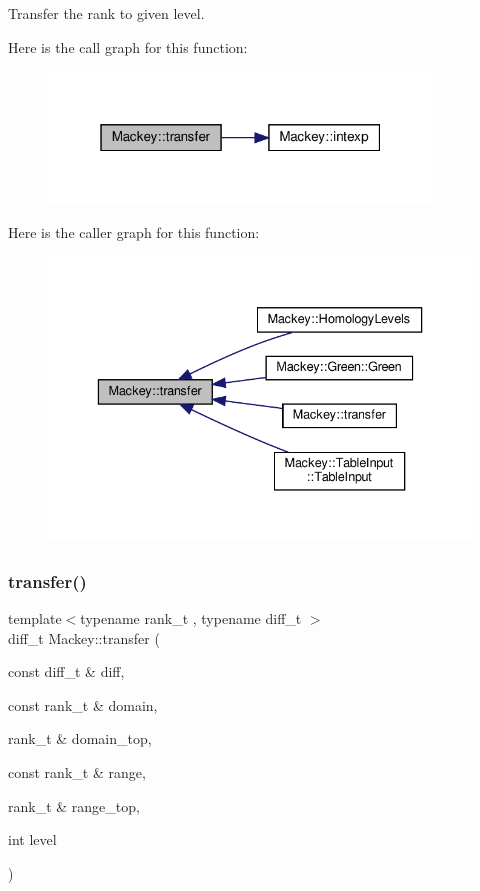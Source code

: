 Transfer the rank to given level. 

Here is the call graph for this function\+:\nopagebreak
\begin{figure}[H]
\begin{center}
\leavevmode
\includegraphics[width=289pt]{namespaceMackey_a671613d53fc3b0c9c4b115bc8b2797e6_cgraph}
\end{center}
\end{figure}
Here is the caller graph for this function\+:\nopagebreak
\begin{figure}[H]
\begin{center}
\leavevmode
\includegraphics[width=336pt]{namespaceMackey_a671613d53fc3b0c9c4b115bc8b2797e6_icgraph}
\end{center}
\end{figure}
\mbox{\label{namespaceMackey_ad7524839b58c80d4b2c54827e4833b12}} 
\subsubsection{\texorpdfstring{transfer()}{transfer()}\hspace{0.1cm}{\footnotesize\ttfamily [2/5]}}
{\footnotesize\ttfamily template$<$typename rank\+\_\+t , typename diff\+\_\+t $>$ \\
diff\+\_\+t Mackey\+::transfer (\begin{DoxyParamCaption}\item[{const diff\+\_\+t \&}]{diff,  }\item[{const rank\+\_\+t \&}]{domain,  }\item[{rank\+\_\+t \&}]{domain\+\_\+top,  }\item[{const rank\+\_\+t \&}]{range,  }\item[{rank\+\_\+t \&}]{range\+\_\+top,  }\item[{int}]{level }\end{DoxyParamCaption})}



